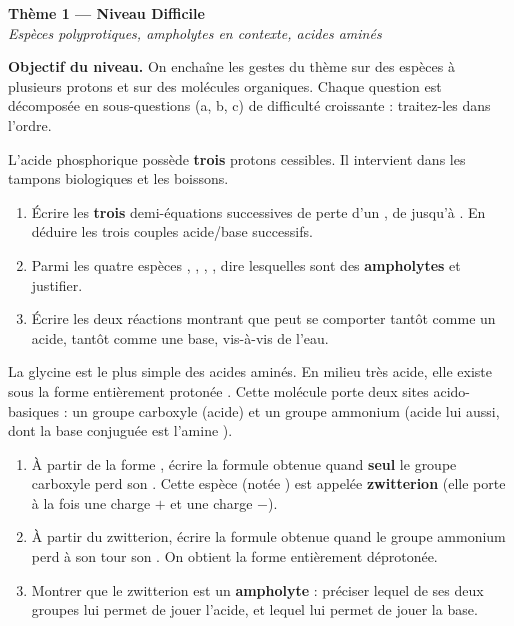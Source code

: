 \documentclass[11pt,a4paper]{article}
\begin{document}
\begin{center}
{\LARGE\bfseries\color{primarydark} Thème 1 --- Niveau Difficile}\\[2pt]
{\color{primary}\itshape Espèces polyprotiques, ampholytes en contexte, acides aminés}
\end{center}

\begin{consigne}
\textbf{Objectif du niveau.} On enchaîne les gestes du thème sur des espèces à plusieurs protons et sur des
molécules organiques. Chaque question est décomposée en sous-questions (a, b, c) de difficulté croissante :
traitez-les dans l'ordre.
\end{consigne}

\begin{exobox}
L'acide phosphorique  possède \textbf{trois} protons cessibles. Il intervient dans les tampons
biologiques et les boissons.
\begin{enumerate}[label=\alph*),leftmargin=1.6em,itemsep=3pt]
  \item Écrire les \textbf{trois} demi-équations successives de perte d'un , de  jusqu'à
        . En déduire les trois couples acide/base successifs.
  \item Parmi les quatre espèces , , , , dire lesquelles sont
        des \textbf{ampholytes} et justifier.
  \item Écrire les deux réactions montrant que  peut se comporter tantôt comme un acide, tantôt
        comme une base, vis-à-vis de l'eau.
\end{enumerate}
\end{exobox}

\begin{exobox}
La glycine est le plus simple des acides aminés. En milieu très acide, elle existe sous la forme
entièrement protonée . Cette molécule porte deux sites acido-basiques : un groupe
carboxyle  (acide) et un groupe ammonium  (acide lui aussi, dont la base conjuguée est
l'amine ).
\begin{enumerate}[label=\alph*),leftmargin=1.6em,itemsep=3pt]
  \item À partir de la forme , écrire la formule obtenue quand \textbf{seul} le groupe
        carboxyle perd son . Cette espèce (notée ) est appelée \textbf{zwitterion}
        (elle porte à la fois une charge $+$ et une charge $-$).
  \item À partir du zwitterion, écrire la formule obtenue quand le groupe ammonium perd à son tour son
        . On obtient la forme entièrement déprotonée.
  \item Montrer que le zwitterion  est un \textbf{ampholyte} : préciser lequel de ses deux
        groupes lui permet de jouer l'acide, et lequel lui permet de jouer la base.
\end{enumerate}
\end{exobox}
\end{document}
